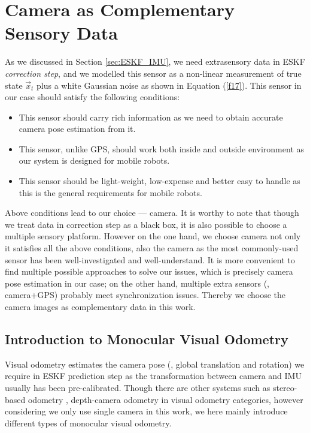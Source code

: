 \section{Camera as Complementary Sensory Data}
\label{sec:camera_comple_data}

As we discussed in Section \ref{sec:ESKF_IMU}, we need extrasensory data in ESKF \textit{correction step}, and we modelled this sensor as a non-linear measurement of true state $\vec{x}_t$ plus a white Gaussian noise as shown in Equation (\ref{f17}). This sensor in our case should satisfy the following conditions:
\begin{itemize}
\item {This sensor should carry rich information as we need to obtain accurate camera pose estimation from it.}
\item {This sensor, unlike GPS, should work both inside and outside environment as our system is designed for mobile robots.}
\item {This sensor should be light-weight, low-expense and better easy to handle as this is the general requirements for mobile robots.}
\end{itemize}
Above conditions lead to our choice --- camera. It is worthy to note that though we treat data in correction step as a black box, it is also possible to choose a multiple sensory platform. However on the one hand, we choose camera not only it satisfies all the above conditions, also the camera as the most commonly-used sensor has been well-investigated and well-understand. It is more convenient to find multiple possible approaches to solve our issues, which is precisely camera pose estimation in our case; on the other hand, multiple extra sensors (\ie, camera+GPS) probably meet synchronization issues. Thereby we choose the camera images as complementary data in this work.

\subsection{Introduction to Monocular Visual Odometry}
\label{subsec:camera_comple_data_sub1}

Visual odometry estimates the camera pose (\eg, global translation and rotation) we require in ESKF prediction step as the transformation between camera and IMU usually has been pre-calibrated. Though there are other systems such as stereo-based odometry \cite{mei2009constant}, depth-camera odometry \cite{newcombe2011kinectfusion} in visual odometry categories, however considering we only use single camera in this work, we here mainly introduce different types of monocular visual odometry.

